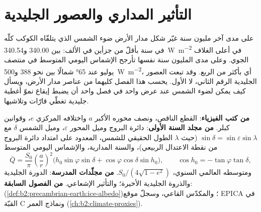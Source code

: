 \chapter{التأثير المداري والعصور الجليدية}\label{ch:b2:orbital-forcing}

على مدى آخر مليون سنة غيّر شكل مدار الأرض ضوء الشمس الذي يتلقّاه
الكوكب كلّه في سنة بأقلّ من جزأين في الألف: بين \num{340.00}
و\qty{340.54}{W.m^{-2}} في أعلى الغلاف الجوي. وعلى مدى المليون سنة نفسها تأرجح الإشماس اليومي المتوسط
في منتصف يوليو عند \ang{65} شمالًا بين نحو 388 و\qty{500}{W.m^{-2}}، أي بأكثر من
الربع. وقد تبعت العصور الجليدية الرقم الثاني، لا الأول. يحسب هذا الفصل كليهما
من عناصر مدار الأرض، ويسأل كيف يمكن لضوء الشمس عند عرض واحد في فصل واحد
أن يضبط إيقاع نموّ أغطية جليدية تغطّي قارّات وتلاشيها.

\begin{recall}
\textbf{من كتب الفيزياء}: القطع الناقص، ونصف محوره الأكبر $a$ واختلافه المركزي $e$، وقوانين
كبلر. \textbf{من مجلد السنة الأولى}: دائرة البروج وميل المحور $\varepsilon$، وميل
الشمس $\delta$ مع $\sin\delta = \sin\varepsilon\sin\lambda$ (حيث $\lambda$ الطول الحقيقي للشمس،
المعدود على امتداد دائرة البروج من نقطة الاعتدال الربيعي)، والسنة المدارية، والإشماس
اليومي المتوسط
\[
  \bar Q = \frac{S_0}{\pi}\left(\frac{a}{r}\right)^{2}\bigl(h_0\sin\varphi\sin\delta +
  \cos\varphi\cos\delta\sin h_0\bigr),\qquad \cos h_0 = -\tan\varphi\tan\delta ,
\]
ومتوسطه العالمي السنوي، $S_0/(4\sqrt{1 - e^2})$. \textbf{من مجلّدات المدرسة}: الدورة
الجليدية والذروة الجليدية الأخيرة؛ والتأثير الإشعاعي. \textbf{من الفصول السابقة}:
 (\cref{def:b2:precambrian-earth:ice-albedo})؛ والمكدّس القاعي، وسجلّ موقع EPICA
في القبّة C ونماذج العمر (\cref{ch:b2:climate-proxies}).
\end{recall}

